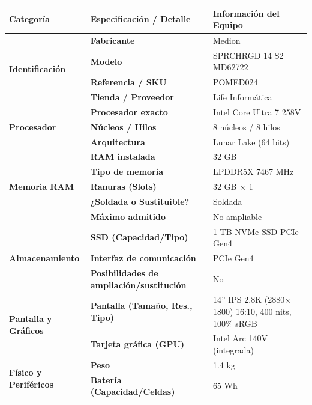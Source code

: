 \documentclass[11.5pt]{article}
\begin{document}
	\begin{table}[H]
		\centering
		\footnotesize
		\renewcommand{\arraystretch}{1.2}
		\begin{tabularx}{\textwidth}{|l|l|X|}
			\hline
			\textbf{Categoría} & \textbf{Especificación / Detalle} & \textbf{Información del Equipo} \\
			\hline
			\multirow{4}{*}{\textbf{Identificación}} 
			& \textbf{Fabricante} & Medion \\
			\cline{2-3}
			& \textbf{Modelo} & SPRCHRGD 14 S2 MD62722 \\
			\cline{2-3}
			& \textbf{Referencia / SKU} & POMED024 \\
			\cline{2-3}
			& \textbf{Tienda / Proveedor} & Life Informática \\
			\hline
			\multirow{3}{*}{\textbf{Procesador}} 
			& \textbf{Procesador exacto} & Intel Core Ultra 7 258V \\
			\cline{2-3}
			& \textbf{Núcleos / Hilos} & 8 núcleos / 8 hilos \\
			\cline{2-3}
			& \textbf{Arquitectura} & Lunar Lake (64 bits) \\
			\hline
			\multirow{5}{*}{\textbf{Memoria RAM}} 
			& \textbf{RAM instalada} & 32 GB \\
			\cline{2-3}
			& \textbf{Tipo de memoria} & LPDDR5X 7467 MHz \\
			\cline{2-3}
			& \textbf{Ranuras (Slots)} & 32 GB \(\times\) 1 \\
			\cline{2-3}
			& \textbf{¿Soldada o Sustituible?} & Soldada \\
			\cline{2-3}
			& \textbf{Máximo admitido} & No ampliable \\
			\hline
			\multirow{3}{*}{\textbf{Almacenamiento}} 
			& \textbf{SSD (Capacidad/Tipo)} & 1 TB NVMe SSD PCIe Gen4 \\
			\cline{2-3}
			& \textbf{Interfaz de comunicación} & PCIe Gen4 \\
			\cline{2-3}
			& \textbf{Posibilidades de ampliación/sustitución} & No \\
			\hline
			\multirow{2}{*}{\textbf{Pantalla y Gráficos}} 
			& \textbf{Pantalla (Tamaño, Res., Tipo)} & 14'' IPS 2.8K (2880\(\times\)1800) 16:10, 400 nits, 100\% sRGB \\
			\cline{2-3}
			& \textbf{Tarjeta gráfica (GPU)} & Intel Arc 140V (integrada) \\
			\hline
			\multirow{4}{*}{\textbf{Físico y Periféricos}} 
			& \textbf{Peso} & 1.4 kg \\
			\cline{2-3}
			& \textbf{Batería (Capacidad/Celdas)} & 65 Wh \\

\end{tabularx}
\end{table}
\end{document}
